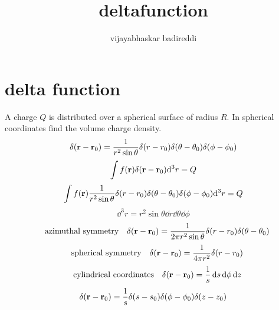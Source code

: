 \documentclass[12pt]{article}
\title{deltafunction}
\author{vijayabhaskar badireddi}
\date{}
\begin{document}
\section*{delta function}
A charge $Q$ is distributed over a spherical surface of radius $R$. In spherical coordinates find the volume charge density. 
\[\delta(\vb{r}-\vb{r}_0)=\frac{1}{r^2\sin\theta}\delta(r-r_0)\delta(\theta-\theta_0)\delta(\phi-\phi_0)\]
\[\int f(\vb{r})\delta(\vb{r}-\vb{r}_0)\dd^3{r}=Q\]
\[\int f(\vb{r})\frac{1}{r^2\sin\theta}\delta(r-r_0)\delta(\theta-\theta_0)\delta(\phi-\phi_0)\dd^3{r}=Q\]
\[\dd^3{r}=r^2\sin\theta\dd{r}\dd{\theta}\dd{\phi}\]
\[\qq{azimuthal symmetry} \delta(\vb{r}-\vb{r}_0)=\frac{1}{2\pi r^2\sin\theta}\delta(r-r_0)\delta(\theta-\theta_0)\]
\[\qq{spherical symmetry} \delta(\vb{r}-\vb{r}_0)=\frac{1}{4\pi r^2}\delta(r-r_0)\]
\[\qq{cylindrical coordinates}\delta(\vb{r}-\vb{r}_0)=\frac{1}{s}\dd{s}\dd{\phi}\dd{z}\]
\[\delta(\vb{r}-\vb{r}_0)=\frac{1}{s}\delta{(s-s_0)}\delta{(\phi-\phi_0)}\delta{(z-z_0)}\]
\end{document}
